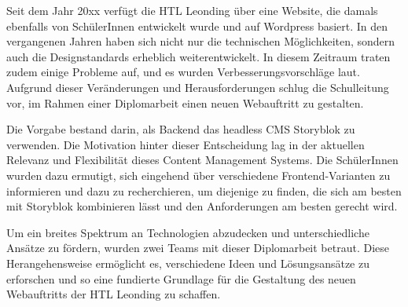 \author{Mona Angerer}

Seit dem Jahr 20xx verfügt die HTL Leonding über eine Website, die damals ebenfalls von SchülerInnen entwickelt wurde und auf Wordpress basiert. 
In den vergangenen Jahren haben sich nicht nur die technischen Möglichkeiten, sondern auch die Designstandards erheblich weiterentwickelt. 
In diesem Zeitraum traten zudem einige Probleme auf, und es wurden Verbesserungsvorschläge laut. Aufgrund dieser Veränderungen und Herausforderungen 
schlug die Schulleitung vor, im Rahmen einer Diplomarbeit einen neuen Webauftritt zu gestalten.

Die Vorgabe bestand darin, als Backend das headless CMS Storyblok zu verwenden. Die Motivation hinter dieser Entscheidung 
lag in der aktuellen Relevanz und Flexibilität dieses Content Management Systems. Die SchülerInnen wurden dazu ermutigt, 
sich eingehend über verschiedene Frontend-Varianten zu informieren und dazu zu recherchieren, um diejenige zu finden, 
die sich am besten mit Storyblok kombinieren lässt und den Anforderungen am besten gerecht wird.

Um ein breites Spektrum an Technologien abzudecken und unterschiedliche Ansätze zu fördern, wurden zwei Teams mit dieser Diplomarbeit betraut. 
Diese Herangehensweise ermöglicht es, verschiedene Ideen und Lösungsansätze zu erforschen und so eine fundierte Grundlage für die Gestaltung 
des neuen Webauftritts der HTL Leonding zu schaffen.
